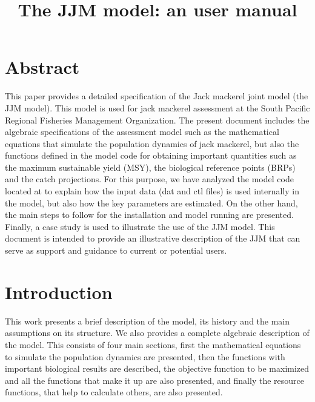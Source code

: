 \documentclass{article}
\title{The JJM model: an user manual}
\date{\parbox{\linewidth}{\centering%
  \skip
  Mirian GERONIMO \hspace*{3cm} Criscely LUJAN \endgraf\medskip
  Instituto del Mar del Perú (IMARPE)}
  }
\begin{document}
\maketitle
\tableofcontents
\newpage
\section*{Abstract} 


This paper provides a detailed specification of the Jack mackerel joint model (the JJM model). This model is used for jack mackerel assessment at the South Pacific Regional Fisheries Management Organization. The present document includes the algebraic specifications of the assessment model such as the mathematical equations that simulate the population dynamics of jack mackerel, but also the functions defined in the model code for obtaining important quantities such as the maximum sustainable yield (MSY), the biological reference points (BRPs) and the catch projections. For this purpose, we have analyzed the model code located at  \cite{codejjm} to explain how the input data (dat and ctl files) is used internally in the model, but also how the key parameters are estimated. On the other hand, the main steps to follow for the installation and model running are presented. Finally, a case study is used to illustrate the use of the JJM model. This document is intended to provide an illustrative description of the JJM that can serve as support and guidance to current or potential users.
\section{Introduction}
This work presents a brief description of the model, its history and the main assumptions on its structure. We also provides a complete algebraic description of the model. This consists of four main sections, first the mathematical equations to simulate the population dynamics are presented, then the functions with important biological results are described, the objective function to be maximized and all the functions that make it up are also presented, and finally the resource functions, that help to calculate others, are also presented.
\end{document}

